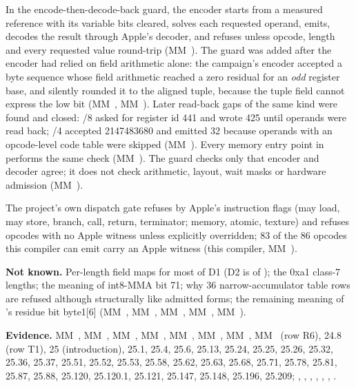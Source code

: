 In the encode-then-decode-back guard, the encoder starts from a measured reference with its variable bits cleared,
solves each requested operand, emits, decodes the result through Apple's decoder, and refuses unless opcode, length and
every requested value round-trip (MM~). The guard was added after the encoder had relied on field arithmetic
alone: the campaign's encoder accepted a byte sequence whose field arithmetic reached a zero residual for an \emph{odd} register
base, and silently rounded it to the aligned tuple, because the tuple field cannot express the low bit (MM~, MM~).
Later read-back gaps of the same kind were found and closed: /8 asked for
register id 441 and wrote 425 until operands were read back; /4 accepted 2147483680
and emitted 32 because operands with an opcode-level code table were skipped (MM~). Every memory entry point in
 performs the same check (MM~). The guard checks only that encoder and decoder agree; it does not check
arithmetic, layout, wait masks or hardware admission (MM~).

The project's own dispatch gate refuses by Apple's instruction flags (may load, may store, branch, call, return,
terminator; memory, atomic, texture) and refuses opcodes with no Apple witness unless explicitly overridden; 83 of the 86
opcodes this compiler can emit carry an Apple witness (this compiler, MM~).

\textbf{Not known.} Per-length field maps for most of D1 (D2 is  of ); the 0xa1 class-7 lengths; the meaning of
int8-MMA bit 71; why 36 narrow-accumulator table rows are refused although structurally like admitted forms; the
remaining meaning of 's residue bit byte1{[}6{]} (MM~, MM~, MM~, MM~, MM~).

\textbf{Evidence.} MM~, MM~, MM~, MM~, MM~, MM~, MM~, MM~ (row R6), 24.8 (row T1), 25 (introduction), 25.1, 25.4, 25.6, 25.13, 25.24,
25.25, 25.26, 25.32, 25.36, 25.37, 25.51, 25.52, 25.53, 25.58, 25.62, 25.63, 25.68, 25.71, 25.78, 25.81, 25.87, 25.88,
25.120, 25.120.1, 25.121, 25.147, 25.148, 25.196, 25.209; , ,
, , , ,
.
